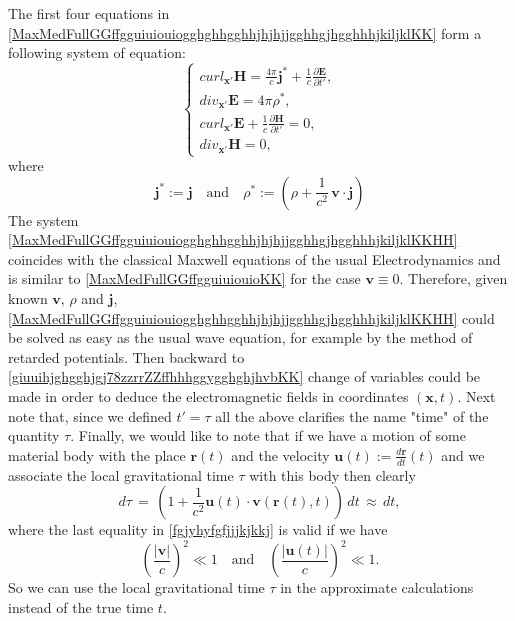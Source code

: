 \documentclass{article}
\theoremstyle{definition}
\theoremstyle{remark}
\renewcommand{\vec}[1]{\mathbf{#1}}
\newcommand{\er}{\eqref}
\newcommand{\er}{\eqref}
\begin{document}
The first four equations in
\er{MaxMedFullGGffgguiuiouiogghghhgghhjhjhjjgghhgjhgghhhjkiljklKK}
form a following system of equation:
\begin{equation}\label{MaxMedFullGGffgguiuiouiogghghhgghhjhjhjjgghhgjhgghhhjkiljklKKHH}
\begin{cases}
curl_{\vec x'}\vec H= \frac{4\pi}{c}\vec j^*+
\frac{1}{c}\frac{\partial \vec E}{\partial
t'},\\
div_{\vec x'}\vec E= 4\pi\rho^*,\\
curl_{\vec x'}\vec E+\frac{1}{c}\frac{\partial\vec H}{\partial
t'}=0,\\
div_{\vec x'}\vec H=0,
\end{cases}
\end{equation}
where
\begin{equation}\label{fgjyhyfgfjjjk}
\vec j^*:=\vec
j\quad\text{and}\quad\rho^*:=\left(\rho+\frac{1}{c^2}\,\vec
v\cdot\vec j\right)
\end{equation}
The system
\er{MaxMedFullGGffgguiuiouiogghghhgghhjhjhjjgghhgjhgghhhjkiljklKKHH}
coincides with the classical Maxwell equations of the usual
Electrodynamics and is similar to \er{MaxMedFullGGffgguiuiouioKK}
for the case $\vec v\equiv 0$. Therefore, given known $\vec v$,
$\rho$ and $\vec j$,
\er{MaxMedFullGGffgguiuiouiogghghhgghhjhjhjjgghhgjhgghhhjkiljklKKHH}
could be solved as easy as the usual wave equation, for example by
the method of retarded potentials. Then backward to
\er{giuuihjghgghjgj78zzrrZZffhhhggygghghjhvbKK} change of variables
could be made in order to deduce the electromagnetic fields in
coordinates $(\vec x,t)$. Next note that, since we defined $t'=\tau$
all the above clarifies the name "time" of the quantity $\tau$.
Finally, we would like to note that if we have a motion of some
material body with the place $\vec r(t)$ and the velocity $\vec
u(t):=\frac{d\vec r}{dt}(t)$ and we associate the local
gravitational time $\tau$ with this body then clearly
\begin{equation}\label{fgjyhyfgfjjjkjkkj}
d\tau\,=\, \left(1+\frac{1}{c^2}\vec u(t)\cdot \vec v\left(\vec
r(t),t\right)\right)\,dt\,\approx\, dt,
\end{equation}
where the last equality in \er{fgjyhyfgfjjjkjkkj} is valid if we
have
\begin{equation}\label{fgjyhyfgfjjjkkkk}
\left(\frac{|\vec v|}{c}\right)^2\ll
1\quad\text{and}\quad\left(\frac{|\vec u(t)|}{c}\right)^2\ll 1.
\end{equation}
So we can use the local gravitational time $\tau$ in the approximate
calculations instead of the true time $t$.
\end{document}

